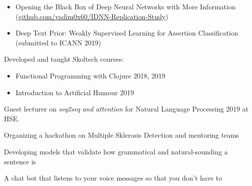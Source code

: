
\begin{itemize}
    \item Opening the Black Box of Deep Neural Networks with More Information (\url{github.com/vadim0x60/IDNN-Replication-Study})
    \item Deep Text Prior: Weakly Supervised Learning for Assertion Classification (submitted to ICANN 2019)
\end{itemize}







Developed and taught Skoltech courses:
\begin{itemize}
    \item Functional Programming with Clojure 2018, 2019
    \item Introduction to Artificial Humour 2019
\end{itemize}
Guest lecturer on \emph{seq2seq and attention} for Natural Language Processing 2019 at HSE.

Organizing a hackathon on Multiple Sklerosis Detection and mentoring teams

\smallskip

Developing models that validate how grammatical and natural-sounding a sentence is

\smallskip

A chat bot that listens to your voice messages so that you don't have to

\smallskip

